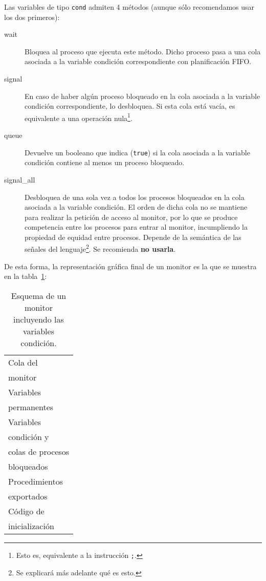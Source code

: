 Las variables de tipo \verb|cond| admiten 4 métodos (aunque sólo recomendamos usar los dos primeros):
\begin{description}
    \item [wait] Bloquea al proceso que ejecuta este método. Dicho proceso pasa a una cola asociada a la variable condición correspondiente con planificación FIFO.
    \item [signal] En caso de haber algún proceso bloqueado en la cola asociada a la variable condición correspondiente, lo desbloquea. Si esta cola está vacía, es equivalente a una operación nula\footnote{Esto es, equivalente a la instrucción \texttt{;}.}.
    \item [queue] Devuelve un booleano que indica (\verb|true|) si la cola asociada a la variable condición contiene al menos un proceso bloqueado.
    \item [signal\_all] Desbloquea de una sola vez a todos los procesos bloqueados en la cola asociada a la variable condición. El orden de dicha cola no se mantiene para realizar la petición de acceso al monitor, por lo que se produce competencia entre los procesos para entrar al monitor, incumpliendo la propiedad de equidad entre procesos. Depende de la semántica de las señales del lenguaje\footnote{Se explicará más adelante qué es esto.}. Se recomienda \textbf{no usarla}.
\end{description}
De esta forma, la representación gráfica final de un monitor es la que se muestra en la tabla~\ref{esq:monitor_3}:
\begin{table}[H]
\centering
\begin{tabular}{|l|}
\hline
Cola del\\
monitor \\
\hline
Variables \\
permanentes \\
\hline
Variables \\
condición y\\
colas de procesos\\
bloqueados\\
\hline
Procedimientos \\
exportados \\
\hline
Código de \\ 
inicialización \\
\hline
\end{tabular}
\caption{Esquema de un monitor incluyendo las variables condición.}
\label{esq:monitor_3}
\end{table}

